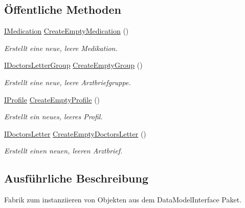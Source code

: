 \subsection*{Öffentliche Methoden}
\begin{DoxyCompactItemize}
\item 
\mbox{\hyperlink{interfacemy_m_d_1_1_model_interface_1_1_data_model_interface_1_1_i_medication}{I\+Medication}} \mbox{\hyperlink{interfacemy_m_d_1_1_model_1_1_entity_factory_1_1_i_entity_factory_a02bf5fe00d1c0b40dbc510ce74619a33}{Create\+Empty\+Medication}} ()
\begin{DoxyCompactList}\small\item\em Erstellt eine neue, leere Medikation. \end{DoxyCompactList}\item 
\mbox{\hyperlink{interfacemy_m_d_1_1_model_interface_1_1_data_model_interface_1_1_i_doctors_letter_group}{I\+Doctors\+Letter\+Group}} \mbox{\hyperlink{interfacemy_m_d_1_1_model_1_1_entity_factory_1_1_i_entity_factory_afca4ecdc59f292073c7a40d258057484}{Create\+Empty\+Group}} ()
\begin{DoxyCompactList}\small\item\em Erstellt eine neue, leere Arztbriefgruppe. \end{DoxyCompactList}\item 
\mbox{\hyperlink{interfacemy_m_d_1_1_model_interface_1_1_data_model_interface_1_1_i_profile}{I\+Profile}} \mbox{\hyperlink{interfacemy_m_d_1_1_model_1_1_entity_factory_1_1_i_entity_factory_add734631a85e6021f04c4185f66e351d}{Create\+Empty\+Profile}} ()
\begin{DoxyCompactList}\small\item\em Erstellt ein neues, leeres Profil. \end{DoxyCompactList}\item 
\mbox{\hyperlink{interfacemy_m_d_1_1_model_interface_1_1_data_model_interface_1_1_i_doctors_letter}{I\+Doctors\+Letter}} \mbox{\hyperlink{interfacemy_m_d_1_1_model_1_1_entity_factory_1_1_i_entity_factory_af4555786de34d8a68afce2709fb6b9e8}{Create\+Empty\+Doctors\+Letter}} ()
\begin{DoxyCompactList}\small\item\em Erstellt einen neuen, leeren Arztbrief. \end{DoxyCompactList}\end{DoxyCompactItemize}


\subsection{Ausführliche Beschreibung}
Fabrik zum instanziieren von Objekten aus dem Data\+Model\+Interface Paket. 

